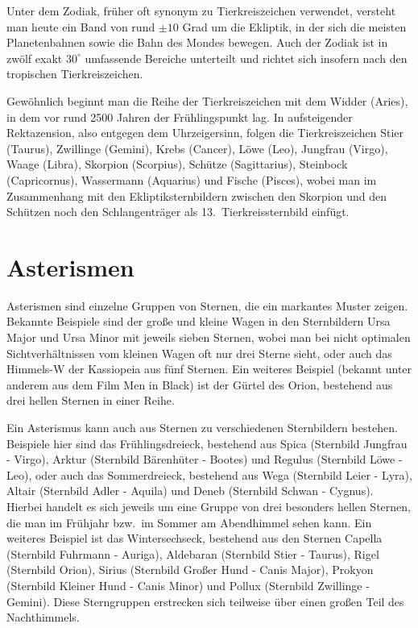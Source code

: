 Unter dem Zodiak, 
fr\"uher oft synonym zu Tierkreiszeichen verwendet, versteht man heute ein Band von rund 
$\pm 10$ Grad um die Ekliptik, in der sich die meisten Planetenbahnen sowie die Bahn des Mondes bewegen. Auch 
der Zodiak ist in zw\"olf exakt $30^\circ$ umfassende Bereiche unterteilt und richtet sich insofern nach den
tropischen Tierkreiszeichen. 

Gew\"ohnlich beginnt man die Reihe der Tierkreiszeichen mit dem 
Widder (Aries), in dem vor rund 2500 Jahren der 
Fr\"uhlingspunkt lag. In aufsteigender Rektazension, also entgegen dem Uhrzeigersinn, folgen die Tierkreiszeichen
Stier (Taurus), Zwillinge (Gemini), Krebs (Cancer), L\"owe (Leo), Jungfrau (Virgo), Waage (Libra), Skorpion (Scorpius),
Sch\"utze (Sagittarius), Steinbock (Capricornus), Wassermann (Aquarius) und Fische (Pisces), wobei man 
im Zusammenhang mit den Ekliptiksternbildern 
zwischen den Skorpion und den Sch\"utzen noch den Schlangentr\"ager als 13.\ Tierkreissternbild einf\"ugt. 

\section{Asterismen}

Asterismen 
sind einzelne Gruppen von Sternen, die ein markantes Muster zeigen. Bekannte
Beispiele sind der gro\ss e und kleine Wagen in den Sternbildern Ursa Major und Ursa Minor mit jeweils
sieben Sternen, wobei man bei nicht optimalen Sichtverh\"altnissen vom kleinen Wagen oft nur drei
Sterne sieht, oder auch das Himmels-W der Kassiopeia aus f\"unf Sternen. Ein weiteres Beispiel
(bekannt unter anderem aus dem Film \glqq Men in Black\grqq) ist der G\"urtel des Orion, bestehend
aus drei hellen Sternen in einer Reihe. 

Ein Asterismus kann auch aus Sternen zu verschiedenen Sternbildern bestehen. Beispiele
hier sind das Fr\"uhlingsdreieck, 
bestehend aus Spica (Sternbild Jungfrau - Virgo), Arktur (Sternbild 
B\"arenh\"uter - Bootes) und Regulus (Sternbild L\"owe - Leo), oder auch das 
Sommerdreieck,
bestehend aus Wega (Sternbild Leier - Lyra), Altair (Sternbild Adler - Aquila) und Deneb (Sternbild Schwan - Cygnus). 
Hierbei handelt es sich jeweils um eine Gruppe von drei besonders hellen Sternen, die man im
Fr\"uhjahr bzw.\ im Sommer am Abendhimmel sehen kann. Ein weiteres Beispiel ist das 
Wintersechseck,
bestehend aus den Sternen Capella (Sternbild Fuhrmann - Auriga), Aldebaran (Sternbild Stier - Taurus), 
Rigel (Sternbild Orion), Sirius (Sternbild Gro\ss er Hund - Canis Major), Prokyon (Sternbild Kleiner Hund -
Canis Minor) und Pollux (Sternbild Zwillinge - Gemini). Diese Sterngruppen erstrecken sich teilweise
\"uber einen gro\ss en Teil des Nachthimmels. 

